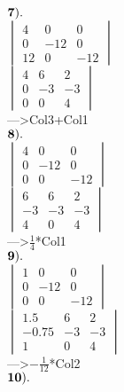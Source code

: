 \documentclass[]{article}
\begin{document}
\(\bold{7).}\)\\

\(\begin{vmatrix} 4 & 0 & 0\\ 0 & -12 & 0 \\ 12 & 0 & -12 \end{vmatrix}\)\\

\(\begin{vmatrix} 4 & 6 & 2\\ 0 & -3 & -3 \\ 0 & 0 & 4 \end{vmatrix}\)\\

---\textgreater{}Col3+Col1\\

\(\bold{8).}\)\\

\(\begin{vmatrix} 4 & 0 & 0\\ 0 & -12 & 0 \\ 0 & 0 & -12 \end{vmatrix}\)\\

\(\begin{vmatrix} 6 & 6 & 2\\ -3 & -3 & -3 \\ 4 & 0 & 4 \end{vmatrix}\)\\

---\textgreater{}\(\frac{1}{4}\)*Col1\\

\(\bold{9).}\)\\

\(\begin{vmatrix} 1 & 0 & 0\\ 0 & -12 & 0 \\ 0 & 0 & -12 \end{vmatrix}\)\\

\(\begin{vmatrix} 1.5 & 6 & 2\\ -0.75 & -3 & -3 \\ 1 & 0 & 4 \end{vmatrix}\)\\

---\textgreater{}\(-\frac{1}{12}\)*Col2\\

\(\bold{10).}\)\\
\end{document}
